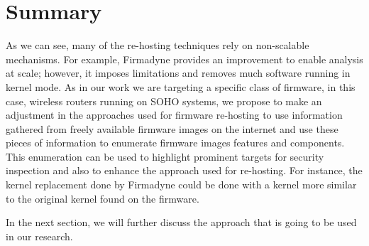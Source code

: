 \section{Summary}


As we can see, many of the re-hosting techniques rely on non-scalable mechanisms. For example, Firmadyne provides an improvement to enable analysis at scale; however, it imposes limitations and removes much software running in kernel mode. As in our work we are targeting a specific class of firmware, in this case, wireless routers running on SOHO systems, we propose to make an adjustment in the approaches used for firmware re-hosting to use information gathered from freely available firmware images on the internet and use these pieces of information to enumerate firmware images features and components. This enumeration can be used to highlight prominent targets for security inspection and also to enhance the approach used for re-hosting. For instance, the kernel replacement done by Firmadyne could be done with a kernel more similar to the original kernel found on the firmware. 

In the next section, we will further discuss the approach that is going to be used in our research.